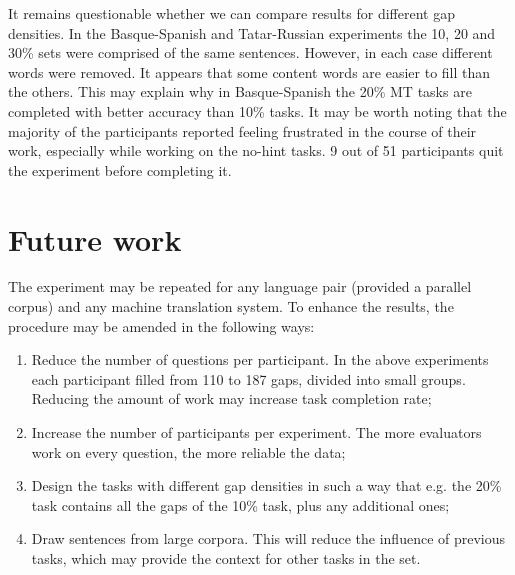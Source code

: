 \documentclass[11pt]{article}
\begin{document}
It remains questionable whether we can compare results for different gap densities. In the
Basque-Spanish and Tatar-Russian experiments the 10, 20 and 30\% sets were comprised
of the same sentences. However, in each case different words were removed. It appears
that some content words are easier to fill than the others. This may explain why in
Basque-Spanish the 20\% MT tasks are completed with better accuracy than 10\% tasks.
It may be worth noting that the majority of the participants reported feeling frustrated in
the course of their work, especially while working on the no-hint tasks. 9 out of 51
participants quit the experiment before completing it.

\section{Future work}
The experiment may be repeated for any language pair (provided a parallel corpus) and
any machine translation system. To enhance the results, the procedure may be amended
in the following ways:
\begin{enumerate}
\item  Reduce the number of questions per participant. In the above experiments each
participant filled from 110 to 187 gaps, divided into small groups. Reducing the
amount of work may increase task completion rate;
\item  Increase the number of participants per experiment. The more evaluators work on
every question, the more reliable the data;
\item  Design the tasks with different gap densities in such a way that e.g. the 20\% task
contains all the gaps of the 10\% task, plus any additional ones;
\item  Draw sentences from large corpora. This will reduce the influence of previous
tasks, which may provide the context for other tasks in the set.
\end{enumerate}





\end{document}
